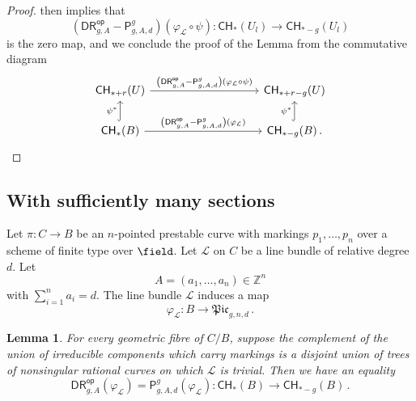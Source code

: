 \documentclass[a4paper,12pt]{article} %
\newcommand{\ca}[1]{{\mathcal{#1}}}
\def\P{\mathsf{P}}
\theoremstyle{definition}
\theoremstyle{plain}%
\newtheorem{lemma}[definition]{Lemma}
\renewcommand{\phi}{\varphi}
\newcommand{\Picabs}{\mathfrak{Pic}}
\newcommand{\Chow}{\mathsf{CH}}
\newcommand{\DRop}{\mathsf{DR}^{\mathsf{op}}}
\begin{document}
\begin{proof}
 then implies that 
\begin{equation}
\left(\DRop_{g,A}-\P_{g,A,d}^g \right)(\phi_{\ca L}\circ \psi)\colon \Chow_*(U_l) \to \Chow_{* - g}(U_l)
\end{equation}
is the zero map, and we conclude the proof of the Lemma from the commutative diagram
\begin{equation}
 \begin{tikzcd}
  \Chow_{*+r}(U) \arrow[rrrr, "\left(\DRop_{g,A}-\P_{g,A,d}^g \right)(\phi_{\ca L}\circ \psi)"]&& && \Chow_{* + r-g}(U)\\
  \Chow_*(B) \arrow[rrrr, "\left(\DRop_{g,A}-\P_{g,A,d}^g\right)(\phi_{\ca L})"] \arrow[u,"\psi^*",hookrightarrow]& &&&\Chow_{* - g}(B) \arrow[u,"\psi^*",hookrightarrow]\, . 
\end{tikzcd}
\end{equation}

\end{proof}



\subsection{With sufficiently many sections}\label{sec:many_markings}

Let $\pi\colon C\to B$ be an $n$-pointed prestable curve 
with markings $p_1,\ldots, p_n$
over a scheme of finite type over ${\field}$. Let
$\ca L$ on $C$ be a line bundle 
of relative degree $d$. 
Let $$A = (a_1,\ldots, a_n) \in\mathbb{Z}^n$$ with $\sum_{i=1}^n a_i = d$.  
The line bundle $\ca L$ induces a map 
$$\phi_{\ca L} \colon B \to \Picabs_{g,n,d}\, .$$



\begin{lemma}\label{lem:many_markings}
For every geometric fibre of $C/B$, suppose the
complement of the union of irreducible components which carry markings
is a disjoint union of trees of nonsingular
rational curves on which $\ca L$ is trivial. Then we have an equality 
\begin{equation}\DRop_{g,A}(\phi_{\ca L})=
\P_{g,A,d}^g(\phi_{\ca L}) \colon \Chow_*(B) \to \Chow_{*-g}(B)\, .
\end{equation}
\end{lemma}
\end{document}
